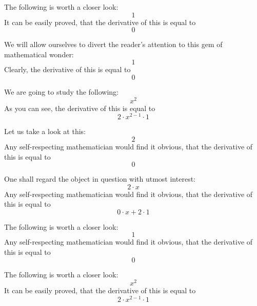 \documentclass{article}
\begin{document}
The following is worth a closer look:
\begin{equation}
1 
\end{equation}
It can be easily proved, that the derivative of this is equal to
\begin{equation}
0 
\end{equation}

We will allow ourselves to divert the reader's attention to this gem of mathematical wonder:
\begin{equation}
1 
\end{equation}
Clearly, the derivative of this is equal to
\begin{equation}
0 
\end{equation}

We are going to study the following:
\begin{equation}
x ^{2 } 
\end{equation}
As you can see, the derivative of this is equal to
\begin{equation}
2 \cdot x ^{2 - 1 } \cdot 1 
\end{equation}

Let us take a look at this:
\begin{equation}
2 
\end{equation}
Any self-respecting mathematician would find it obvious, that the derivative of this is equal to
\begin{equation}
0 
\end{equation}

One shall regard the object in question with utmost interest:
\begin{equation}
2 \cdot x 
\end{equation}
Any self-respecting mathematician would find it obvious, that the derivative of this is equal to
\begin{equation}
0 \cdot x + 2 \cdot 1 
\end{equation}

The following is worth a closer look:
\begin{equation}
1 
\end{equation}
Any self-respecting mathematician would find it obvious, that the derivative of this is equal to
\begin{equation}
0 
\end{equation}

The following is worth a closer look:
\begin{equation}
x ^{2 } 
\end{equation}
It can be easily proved, that the derivative of this is equal to
\begin{equation}
2 \cdot x ^{2 - 1 } \cdot 1 
\end{equation}
\end{document}
